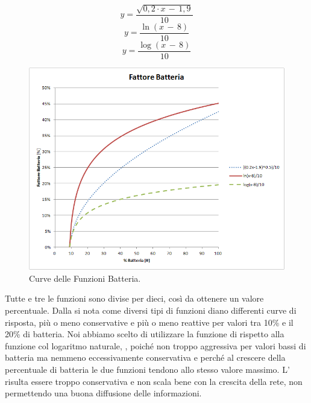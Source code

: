 \begin{equation}
	\label{eq:df_bat_radq}
	y=\dfrac{\sqrt{0,2\cdot x\,-\,1,9}}{10}
\end{equation}
\begin{equation}
	\label{eq:df_bat_ln}
	y=\dfrac{\ln\left(x\,-\,8\right) }{10}
\end{equation}
\begin{equation}
	\label{eq:df_bat_log}
	y=\dfrac{\log\left(x\,-\,8\right) }{10}
\end{equation}

\begin{figure}[tb]
	\centering
	\includegraphics[width=0.9\linewidth, keepaspectratio]{Images/grafici_usati/DF_battery_factor}
	\caption[DF fattore batteria.]{Curve delle Funzioni Batteria.}
	\label{fig:DF_battery_factor}
\end{figure}
Tutte e tre le funzioni sono divise per dieci, così da ottenere un valore percentuale. Dalla  si nota come diversi tipi di funzioni diano differenti curve di risposta, più o meno conservative e più o meno reattive per valori tra 10\% e il 20\% di batteria. Noi abbiamo scelto di utilizzare la funzione di  rispetto alla funzione col logaritmo naturale, , poiché non troppo aggressiva per valori bassi di batteria ma nemmeno eccessivamente conservativa e perché al crescere della percentuale di batteria le due funzioni tendono allo stesso valore massimo. L' risulta essere troppo conservativa e non scala bene con la crescita della rete, non permettendo una buona diffusione delle informazioni.
\medskip

